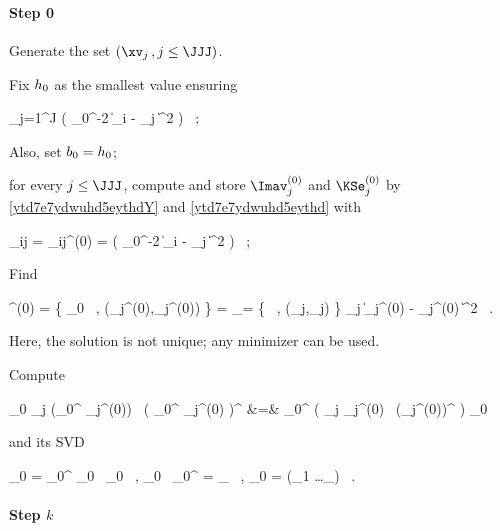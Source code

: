 \paragraph{Step 0}
\begin{mylist}
\item
Generate the set \( (\xv_{j} \, , j \leq \JJJ) \).

\item
Fix \( h_{0} \) as the smallest value ensuring
\begin{EQA}[c]
	\sum_{j=1}^{J} 
	\sumi \Kern\bigl( \hiso_{0}^{-2} \| \Xv_{i} - \xv_{j} \|^{2} \bigr)
	\geq 
	\nmin
	\, ;
\end{EQA}
Also, set \( b_{0} = h_{0} \);
\item 
for every \( j \leq \JJJ \), compute and store \( \Imav_{j}^{(0)} \) and \( \KSe_{j}^{(0)} \) by \eqref{ytd7e7ydwuhd5eythdY} and \eqref{ytd7e7ydwuhd5eythd}
with 
\begin{EQA}[c]
	\weight_{ij} 
	= 
	\weight_{ij}^{(0)}
	= 
	\Kern\bigl( \hiso_{0}^{-2} \| \Xv_{i} - \xv_{j} \|^{2} \bigr) 
	\, ;
\end{EQA}
\item 
Find 
\begin{EQA}[c]
	\prmtv^{(0)} = \{ \BEDR_{0} \, , (\fcn_{j}^{(0)},\fclv_{j}^{(0)}) \} 
	= 
	\arginf_{\prmtv = \{ \BEDR \, , (\fcn_{j},\fclv_{j}) \}} \sum_{j} \biggl\| \Imav_{j}^{(0)} - \KSe_{j}^{(0)}  \biggr\|^{2}
	\, .
\end{EQA} 
Here, the solution is not unique; any minimizer can be used.  

\item 
Compute
\begin{EQA}[rcl]
	\JEDR_{0}
	\eqdef
	\sum_{j} (\BEDR_{0}^{\T} {\fclv}_{j}^{(0)}) \, \bigl( \BEDR_{0}^{\T} {\fclv}_{j}^{(0)} \bigr)^{\T}
	&=&
	\BEDR_{0}^{\T} \Bigl( \sum_{j} {\fclv}_{j}^{(0)} \, ({\fclv}_{j}^{(0)})^{\T} \Bigr) \BEDR_{0}
\end{EQA}
and its SVD
\begin{EQA}[c]
	\JEDR_{0}
	=
	\PEDR_{0}^{\T} \Lambda_{0} \, \PEDR_{0}
	\, ,
	\qquad
	\PEDR_{0} \, \PEDR_{0}^{\T}
	= 
	\Id_{\dimm}
	\, ,
	\quad
	\Lambda_{0} = \diag(\lambda_{1} \geq \ldots \geq \lambda_{\dimm})
	\, .
\end{EQA}
\end{mylist}


\paragraph{Step \( k \)}

